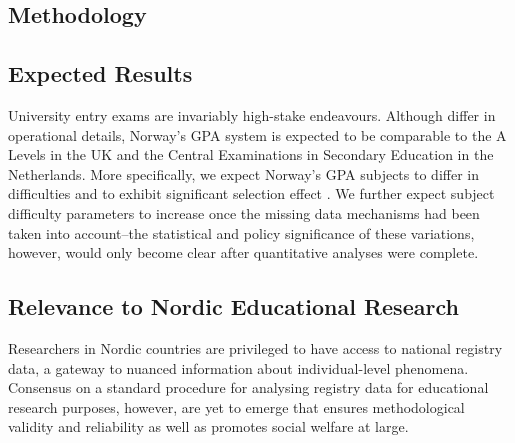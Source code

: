 \subsection{Methodology}



\subsection{Expected Results}

University entry exams are invariably high-stake endeavours. Although differ in operational details, Norway's GPA system is expected to be comparable to the A Levels in the UK and the Central Examinations in Secondary Education in the Netherlands. More specifically, we expect Norway's GPA subjects to differ in difficulties \parencite[per report by][]{he:2018} and to exhibit significant selection effect \parencite[as demonstrated in][]{korobko:2008}. We further expect subject difficulty parameters to increase once the missing data mechanisms had been taken into account--the statistical and policy significance of these variations, however, would only become clear after quantitative analyses were complete.

\subsection{Relevance to Nordic Educational Research}

Researchers in Nordic countries are privileged to have access to national registry data, a gateway to nuanced information about individual-level phenomena. Consensus on a standard procedure for analysing registry data for educational research purposes, however, are yet to emerge that ensures methodological validity and reliability as well as promotes social welfare at large.